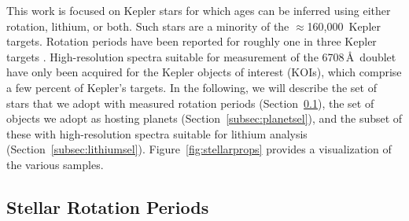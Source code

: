 \documentclass[11pt,twocolumn,tighten]{aastex63}
\newcommand{\nkeplerstars}{$\approx$160{,}000}
\begin{document}
This work is focused on Kepler stars for which ages can be inferred
using either rotation, lithium, or both.  Such stars are a minority of
the \nkeplerstars\ Kepler targets.  Rotation periods have been
reported for roughly one in three Kepler targets
\citep[e.g.][]{McQuillan_2014,Santos_2021}.  High-resolution spectra
suitable for measurement of the  6708\,\AA\ doublet have
only been acquired for the Kepler objects of interest (KOIs), which
comprise a few percent of Kepler's targets.  In the following, we will
describe the set of stars that we adopt with measured rotation periods
(Section~\ref{subsec:rotsel}), the set of objects we adopt as hosting
planets (Section~\ref{subsec:planetsel}), and the subset of these with
high-resolution spectra suitable for lithium analysis
(Section~\ref{subsec:lithiumsel}).  Figure~\ref{fig:stellarprops}
provides a visualization of the various samples.


\subsection{Stellar Rotation Periods}
\label{subsec:rotsel}
\end{document}
